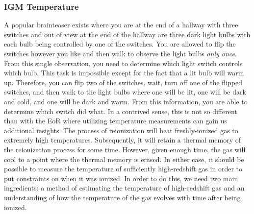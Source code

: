 


\subsubsection{IGM Temperature}

A popular brainteaser exists where you are at the end of a hallway with three switches and out of view at the end of the hallway are three dark light bulbs with each bulb being controlled by one of the switches. You are allowed to flip the switches however you like and then walk to observe the light bulbs \textit{only once}. From this single observation, you need to determine which light switch controls which bulb. This task is impossible except for the fact that a lit bulb will warm up. Therefore, you can flip two of the switches, wait, turn off one of the flipped switches, and then walk to the light bulbs where one will be lit, one will be dark and cold, and one will be dark and warm. From this information, you are able to determine which switch did what. In a contrived sense, this is not so different than with the EoR where utilizing temperature measurements can gain us additional insights. The process of reionization will heat freshly-ionized gas to extremely high temperatures. Subsequently, it will retain a thermal memory of the reionization process for some time. However, given enough time, the gas will cool to a point where the thermal memory is erased. In either case, it should be possible to measure the temperature of sufficiently high-redshift gas in order to put constraints on when it was ionized. In order to do this, we need two main ingredients: a method of estimating the temperature of high-redshift gas and an understanding of how the temperature of the gas evolves with time after being ionized. 


